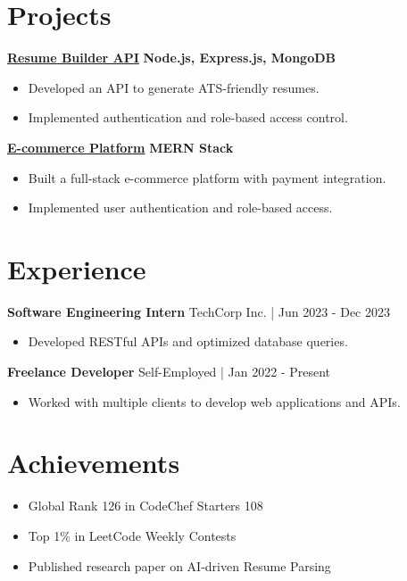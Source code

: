 \documentclass[10pt, letterpaper]{article}
\newenvironment{onecolentry}{}{} %
\begin{document}
\section{Projects}
\begin{onecolentry}
    {\textbf{\large \href{https://github.com/johndoe/resume-builder}{Resume Builder API}}} {\hfill \textbf{Node.js, Express.js, MongoDB}}
    \begin{itemize}
        \item Developed an API to generate ATS-friendly resumes.
        \item Implemented authentication and role-based access control.
    \end{itemize}
\end{onecolentry}
\vspace{7pt}
\begin{onecolentry}
    {\textbf{\large \href{https://github.com/johndoe/ecommerce-app}{E-commerce Platform}}} {\hfill \textbf{MERN Stack}}
    \begin{itemize}
        \item Built a full-stack e-commerce platform with payment integration.
        \item Implemented user authentication and role-based access.
    \end{itemize}
\end{onecolentry}
\vspace{7pt}

\section{Experience}
\begin{onecolentry}
    \textbf{Software Engineering Intern} \hfill TechCorp Inc. | Jun 2023 - Dec 2023
\begin{itemize}
\item Developed RESTful APIs and optimized database queries.
\end{itemize}
\end{onecolentry}
\vspace{7pt}
\begin{onecolentry}
    \textbf{Freelance Developer} \hfill Self-Employed | Jan 2022 - Present
\begin{itemize}
\item Worked with multiple clients to develop web applications and APIs.
\end{itemize}
\end{onecolentry}

\section{Achievements}
\begin{onecolentry}
    \begin{itemize}
        \item Global Rank 126 in CodeChef Starters 108
        \item Top 1\% in LeetCode Weekly Contests
        \item Published research paper on AI-driven Resume Parsing
    \end{itemize}
\end{onecolentry}
\end{document}
